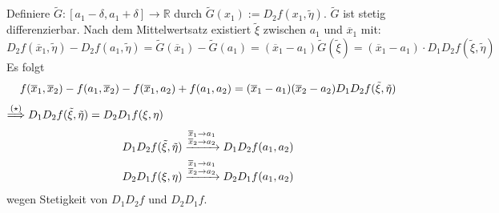 Definiere $\tilde G : [a_1 - \delta , a_1 + \delta ]\to \mathds{R}$ durch $\tilde G(x_1) := D_2 f(x_1, \tilde \eta)$. $\tilde G$ ist stetig differenzierbar. Nach dem 
Mittelwertsatz existiert $\tilde \xi$ zwischen $a_1$ und $\overline{x}_1 $ mit:
\[
	D_2 f(\overline{x}_1 , \tilde \eta ) - D_2 f(a_1, \tilde \eta)= \tilde G (\overline{x}_1 ) - \tilde G(a_1) = (\overline{x}_1 -a_1 )  \tilde G \left( \tilde \xi \right)
	= (\overline{x}_1 - a_1 ) \cdot D_1 D_2 f \left(\tilde \xi, \tilde \eta \right)
\]
Es folgt 
\[
	f(\overline{x}_1, \overline{x}_2  ) - f (a_1, \overline{x}_2 ) - f(\overline{x}_1, a_2 ) + f(a_1, a_2) = (\overline{x}_1 - a_1 ) ( \overline{x}_2 -a_2 ) D_1 D_2 f
	(\tilde \xi , \tilde \eta) 
\]
$\stackrel{(\star)}{\Longrightarrow}   D_1 D_2 f (\tilde \xi, \tilde \eta) = D_2 D_1 f( \xi, \eta) $
\begin{align*}
	D_1 D_2 f (\tilde \xi, \tilde \eta) &\xrightarrow{\substack{\overline{x}_1 \to a_1 \\ \overline{x}_2  \to a_2  }} D_1 D_2 f(a_1, a_2) \\
	D_2 D_1 f( \xi, \eta) &\xrightarrow{\substack{\overline{x}_1 \to a_1 \\ \overline{x}_2  \to a_2  }} D_2 D_1 f(a_1, a_2)
\end{align*}
wegen Stetigkeit von $D_1 D_2 f$ und $D_2 D_1 f$. \bewende 

